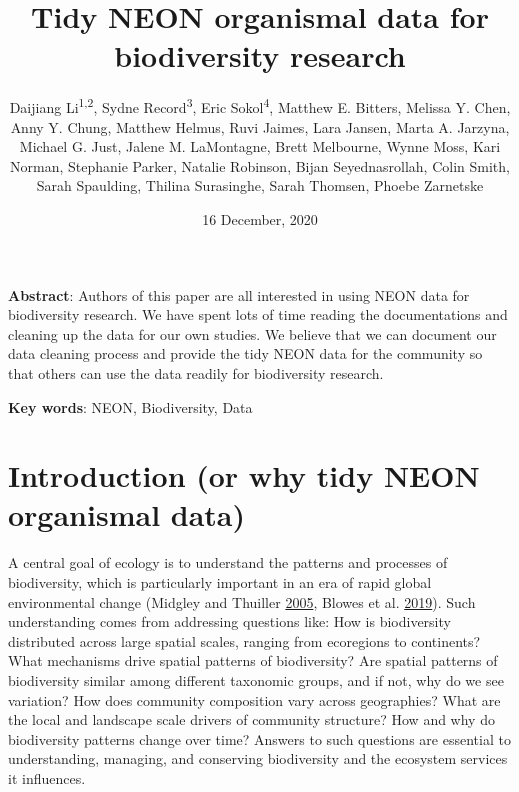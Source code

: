 \documentclass[
  12pt,
]{article}
\title{Tidy NEON organismal data for biodiversity research}
\author{Daijiang Li\textsuperscript{1,2}, Sydne Record\textsuperscript{3}, Eric Sokol\textsuperscript{4}, Matthew E. Bitters, Melissa Y. Chen, Anny Y. Chung, Matthew Helmus, Ruvi Jaimes, Lara Jansen, Marta A. Jarzyna, Michael G. Just, Jalene M. LaMontagne, Brett Melbourne, Wynne Moss, Kari Norman, Stephanie Parker, Natalie Robinson, Bijan Seyednasrollah, Colin Smith, Sarah Spaulding, Thilina Surasinghe, Sarah Thomsen, Phoebe Zarnetske}
\date{16 December, 2020}
\makeatletter
\newcommand\iraggedright{%
  \let\\\@centercr\@rightskip\@flushglue \rightskip\@rightskip
  \leftskip\z@skip}
\makeatother
\begin{document}
\maketitle

\iraggedright

\textbf{Abstract}: Authors of this paper are all interested in using NEON data for biodiversity research. We have spent lots of time reading the documentations and cleaning up the data for our own studies. We believe that we can document our data cleaning process and provide the tidy NEON data for the community so that others can use the data readily for biodiversity research.

\textbf{Key words}: NEON, Biodiversity, Data

\hypertarget{introduction-or-why-tidy-neon-organismal-data}{%
\section{Introduction (or why tidy NEON organismal data)}\label{introduction-or-why-tidy-neon-organismal-data}}

A central goal of ecology is to understand the patterns and processes of biodiversity, which is particularly important in an era of rapid global environmental change (Midgley and Thuiller \protect\hyperlink{ref-midgley2005global}{2005}, Blowes et al. \protect\hyperlink{ref-blowes2019geography}{2019}). Such understanding comes from addressing questions like: How is biodiversity distributed across large spatial scales, ranging from ecoregions to continents? What mechanisms drive spatial patterns of biodiversity? Are spatial patterns of biodiversity similar among different taxonomic groups, and if not, why do we see variation? How does community composition vary across geographies? What are the local and landscape scale drivers of community structure? How and why do biodiversity patterns change over time? Answers to such questions are essential to understanding, managing, and conserving biodiversity and the ecosystem services it influences.
\end{document}

